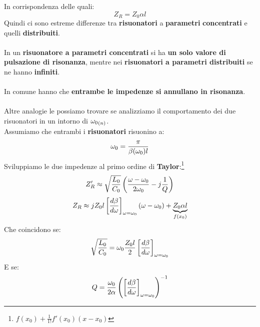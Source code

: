 In corrispondenza delle quali:
\begin{equation*}
    Z_R = Z_0 \alpha l
\end{equation*}
Quindi ci sono estreme differenze tra \textbf{risuonatori} a \textbf{parametri} \textbf{concentrati} e quelli \textbf{distribuiti}.\\ \\
In un \textbf{risuonatore a parametri concentrati} si ha \textbf{un solo valore di pulsazione di risonanza}, mentre nei \textbf{risuonatori a parametri distribuiti} se ne hanno \textbf{infiniti}.\\ \\
In comune hanno che \textbf{entrambe le impedenze si annullano in risonanza}.\\ \\
Altre analogie le possiamo trovare se analizziamo il comportamento dei due risuonatori in un intorno di ${\omega_0}_{(n)}$.\\
Assumiamo che entrambi i \textbf{risuonatori} risuonino a:
\begin{equation*}
    \omega_0 = \frac{\pi}{\beta(\omega_0)l}
\end{equation*}
Sviluppiamo le due impedenze al primo ordine di \textbf{Taylor}:\footnote{$f(x_0) + \frac{1}{1!}f'(x_0) (x-x_0) $}
\begin{equation*}
    Z'_R \approx \sqrt{\frac{L_0}{C_0}} \left(\frac{\omega- \omega_0}{2\omega_0} - j \frac{1}{Q}\right)
\end{equation*}
\begin{equation*}
    Z_R \approx j Z_0 l \left[\frac{d\beta}{d \omega}\right]_{\omega=\omega_0} (\omega - \omega_0) + \underbrace{Z_0 \alpha l}_{f(x_0)}
\end{equation*}
Che coincidono se:
\begin{equation*}
    \sqrt{\frac{L_0}{C_0}} = \omega_0 \frac{Z_0 l}{2} \left[\frac{d\beta}{d \omega}\right]_{\omega=\omega_0}
\end{equation*}
E se:
\begin{equation*}
    Q = \frac{\omega_0}{2\alpha} \left(\left[\frac{d\beta}{d \omega}\right]_{\omega=\omega_0}\right)^{-1}
\end{equation*}
